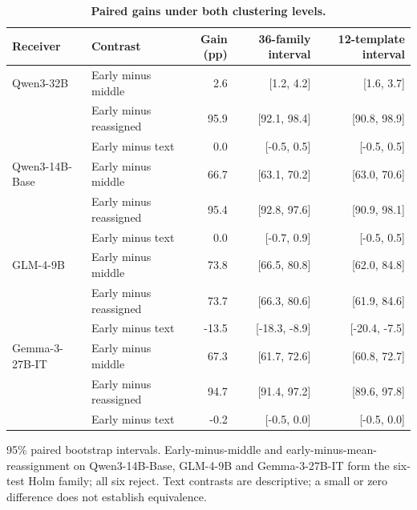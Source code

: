 \begin{table}[!htbp]
\caption{\textbf{Paired gains under both clustering levels.}}
\label{tab:recovery_contrasts}
\centering\small
\setlength{\tabcolsep}{3pt}\renewcommand{\arraystretch}{1.08}
\begin{tabular*}{\linewidth}{@{\extracolsep{\fill}}llrrr@{}}
\toprule
Receiver & Contrast & Gain (pp) & 36-family interval & 12-template interval \\
\midrule
Qwen3-32B & Early minus middle & 2.6 & [1.2, 4.2] & [1.6, 3.7] \\
 & Early minus reassigned & 95.9 & [92.1, 98.4] & [90.8, 98.9] \\
 & Early minus text & 0.0 & [-0.5, 0.5] & [-0.5, 0.5] \\
Qwen3-14B-Base & Early minus middle & 66.7 & [63.1, 70.2] & [63.0, 70.6] \\
 & Early minus reassigned & 95.4 & [92.8, 97.6] & [90.9, 98.1] \\
 & Early minus text & 0.0 & [-0.7, 0.9] & [-0.5, 0.5] \\
GLM-4-9B & Early minus middle & 73.8 & [66.5, 80.8] & [62.0, 84.8] \\
 & Early minus reassigned & 73.7 & [66.3, 80.6] & [61.9, 84.6] \\
 & Early minus text & -13.5 & [-18.3, -8.9] & [-20.4, -7.5] \\
Gemma-3-27B-IT & Early minus middle & 67.3 & [61.7, 72.6] & [60.8, 72.7] \\
 & Early minus reassigned & 94.7 & [91.4, 97.2] & [89.6, 97.8] \\
 & Early minus text & -0.2 & [-0.5, 0.0] & [-0.5, 0.0] \\
\bottomrule
\end{tabular*}
\par\vspace{3pt}
{\footnotesize\raggedright 95\% paired bootstrap intervals. Early-minus-middle and early-minus-mean-reassignment on Qwen3-14B-Base, GLM-4-9B and Gemma-3-27B-IT form the six-test Holm family; all six reject. Text contrasts are descriptive; a small or zero difference does not establish equivalence.\par}
\end{table}
